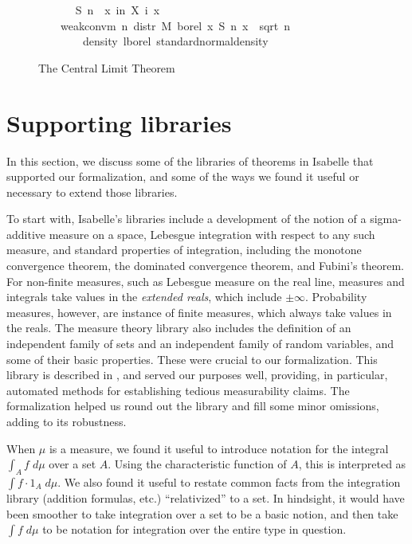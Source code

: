 \documentclass{article}
\begin{document}
\begin{figure}
\begin{isabellebody}
\ \ \isanewline
\ \ \ \ {\isachardoublequoteopen}S\ n\ {\isasymequiv}\ {\isasymlambda}x{\isachardot}\ {\isasymSum}i{\isacharless}n{\isachardot}\ X\ i\ x{\isachardoublequoteclose}\isanewline
\ \ \isanewline
\ \ \ \ {\isachardoublequoteopen}weak{\isacharunderscore}conv{\isacharunderscore}m\ {\isacharparenleft}{\isasymlambda}n{\isachardot}\ distr\ M\ borel\ {\isacharparenleft}{\isasymlambda}x{\isachardot}\ S\ n\ x\ {\isacharslash}\ sqrt\ {\isacharparenleft}n\ {\isacharasterisk}\ {\isasymsigma}\ \isanewline
\ \ \ \ \ \ \ \ {\isacharparenleft}density\ lborel\ standard{\isacharunderscore}normal{\isacharunderscore}density{\isacharparenright}{\isachardoublequoteclose}
\end{isabellebody}
\caption{The Central Limit Theorem}
\label{fig:clt}
\end{figure}

\section{Supporting libraries}

In this section, we discuss some of the libraries of theorems in Isabelle that supported our formalization, and some of the ways we found it useful or necessary to extend those libraries. 

To start with, Isabelle's libraries include a development of the notion of a sigma-additive measure on a space, Lebesgue integration with respect to any such measure, and standard properties of integration, including the monotone convergence theorem, the dominated convergence theorem, and Fubini's theorem. For non-finite measures, such as Lebesgue measure on the real line, measures and integrals take values in the \emph{extended reals}, which include $\pm \infty$. Probability measures, however, are instance of finite measures, which always take values in the reals. The measure theory library also includes the definition of an independent family of sets and an independent family of random variables, and some of their basic properties. These were crucial to our formalization.  This library is described in \cite{hoelzl2012thesis,hoelzl2011measure}, and served our purposes well, providing, in particular, automated methods for establishing tedious measurability claims. The formalization helped us round out the library and fill some minor omissions, adding to its robustness.

When $\mu$ is a measure,  we found it useful to introduce notation for the integral $\int_A f \; d\mu$ over a set $A$. Using the characteristic function of $A$, this is interpreted as $\int f \cdot 1_A \; d\mu$. We also found it useful to restate common facts from the integration library (addition formulas, etc.) ``relativized'' to a set. In hindsight, it would have been smoother to take integration over a set to be a basic notion, and then take $\int f \; d\mu$ to be notation for integration over the entire type in question.
\end{document}
